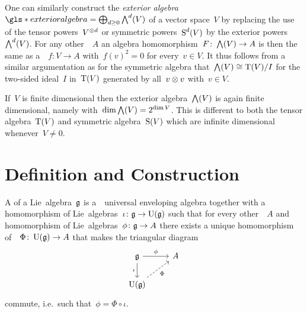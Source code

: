 \begin{remark}
  One can similarly construct the \emph{exterior algebra}~$\gls*{exterior algebra} = \bigoplus_{d \geq 0} \Exterior^d(V)$ of a vector space~$V$ by replacing the use of the tensor powers~$V^{\otimes d}$ or symmetric powers~$\operatorname{S}^d(V)$ by the exterior powers~$\bigwedge^d(V)$.
  For any other~{\algebra{$\kf$}}~$A$ an algebra homomorphism~$F \colon \bigwedge(V) \to A$ is then the same as a~{\linear{$\kf$}}~$f \colon V \to A$ with~$f(v)^2 = 0$ for every~$v \in V$.
  It thus follows from a similar argumentation as for the symmetric algebra that~$\bigwedge(V) \cong \operatorname{T}(V)/I$ for the two-sided ideal~$I$ in~$\operatorname{T}(V)$ generated by all~$v \otimes v$ with~$v \in V$.
  
  
  If~$V$ is finite dimensional then the exterior algebra~$\bigwedge(V)$ is again finite dimensional, namely with~$\dim \bigwedge(V) = 2^{\dim V}$.
  This is different to both the tensor algebra~$\operatorname{T}(V)$ and symmetric algebra~$\operatorname{S}(V)$ which are infinite dimensional whenever~$V \neq 0$.
\end{remark}






\section{Definition and Construction}


\begin{definition}
  A  of a Lie~algebra~$\mathfrak{g}$ is a~\algebra{$\kf$}~\gls*{universal enveloping algebra} together with a homomorphism of Lie~algebras~$\iota \colon \mathfrak{g} \to \operatorname{U}(\mathfrak{g})$ such that for every other~{\algebra{$\kf$}}~$A$ and homomorphism of Lie~algebras~$\phi \colon \mathfrak{g} \to A$ there exists a unique homomorphism of~\algebras{$\kf$}~$\Phi \colon \operatorname{U}(\mathfrak{g}) \to A$ that makes the triangular diagram
  \[
    \begin{tikzcd}
      \glie
      \arrow{r}[above]{\phi}
      \arrow{d}[left]{\iota}
      &
      A
      \\
      \Univ(\glie)
      \arrow[dashed]{ur}[below right]{\Phi}
      &
      {}
    \end{tikzcd}
  \]
  commute, i.e.\ such that~$\phi = \Phi \circ \iota$.
\end{definition}


